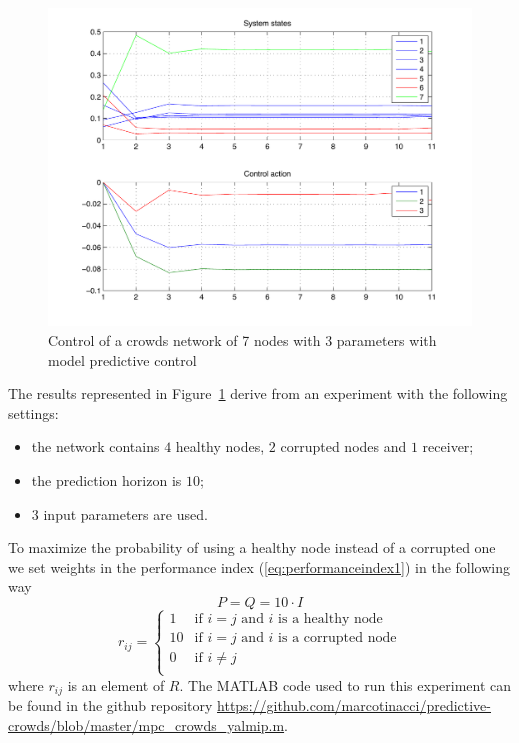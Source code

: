 \documentclass[a4paper, 11pt]{article}
\theoremstyle{definition}
\theoremstyle{remark}
\begin{document}
\begin{figure}[htbp]
	\begin{center}
	\includegraphics[width=.8\textwidth]{images/mpc}
	\end{center}
	\caption{Control of a crowds network of 7 nodes with 3 parameters with model predictive control}
	\label{fig:mpc}
\end{figure}

The results represented in Figure~\ref{fig:mpc} derive from an experiment with the following settings: 
\begin{itemize}
	\item the network contains $4$ healthy nodes, $2$ corrupted nodes and $1$ receiver;
	\item the prediction horizon is $10$;
	\item $3$ input parameters are used.
\end{itemize}
To maximize the probability of using a healthy node instead of a corrupted one we set weights in the performance index (\ref{eq:performanceindex1}) in the following way
\begin{equation} \label{eq:pqmatrix}
	P = Q = 10 \cdot I
\end{equation}
\begin{equation} \label{eq:rmatrix}
	r_{ij} = 
	\begin{cases}
		1 & \mbox{if } i=j \mbox{ and $i$ is a healthy node} \\
		10 & \mbox{if } i=j \mbox{ and $i$ is a corrupted node} \\
		0 & \mbox{if } i\neq j \\
	\end{cases}
\end{equation}
where $r_{ij}$ is an element of $R$. The MATLAB code used to run this experiment can be found in the github repository \url{https://github.com/marcotinacci/predictive-crowds/blob/master/mpc_crowds_yalmip.m}.
\end{document}
